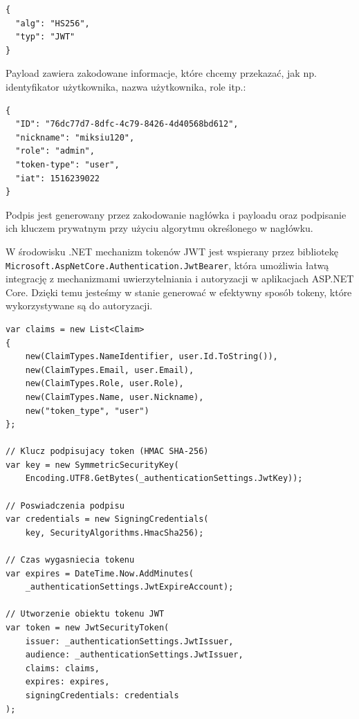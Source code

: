 \smallskip
\begin{lstlisting}
{
  "alg": "HS256",
  "typ": "JWT"
}
\end{lstlisting}

Payload zawiera zakodowane informacje, które chcemy przekazać, jak np. identyfikator użytkownika, nazwa użytkownika, role itp.:

\smallskip
\begin{lstlisting}
{
  "ID": "76dc77d7-8dfc-4c79-8426-4d40568bd612",
  "nickname": "miksiu120",
  "role": "admin",
  "token-type": "user",
  "iat": 1516239022
}
\end{lstlisting}

Podpis jest generowany przez zakodowanie nagłówka i payloadu oraz podpisanie ich kluczem prywatnym przy użyciu algorytmu określonego w nagłówku.

W środowisku .NET mechanizm tokenów JWT jest wspierany przez bibliotekę \linebreak \texttt{Microsoft.AspNetCore.Authentication.JwtBearer}, która umożliwia łatwą integrację z mechanizmami uwierzytelniania i autoryzacji w aplikacjach ASP.NET Core. Dzięki temu jesteśmy w stanie generować w efektywny sposób tokeny, które wykorzystywane są do autoryzacji.

\pagebreak

\begin{lstlisting}[language={[Sharp]C}, caption={Generowanie tokenu JWT w warstwie backendu}, label={lst:jwt-generation}]
var claims = new List<Claim>
{
    new(ClaimTypes.NameIdentifier, user.Id.ToString()),
    new(ClaimTypes.Email, user.Email),
    new(ClaimTypes.Role, user.Role),
    new(ClaimTypes.Name, user.Nickname),
    new("token_type", "user")
};

// Klucz podpisujacy token (HMAC SHA-256)
var key = new SymmetricSecurityKey(
    Encoding.UTF8.GetBytes(_authenticationSettings.JwtKey));

// Poswiadczenia podpisu
var credentials = new SigningCredentials(
    key, SecurityAlgorithms.HmacSha256);

// Czas wygasniecia tokenu
var expires = DateTime.Now.AddMinutes(
    _authenticationSettings.JwtExpireAccount);

// Utworzenie obiektu tokenu JWT
var token = new JwtSecurityToken(
    issuer: _authenticationSettings.JwtIssuer,
    audience: _authenticationSettings.JwtIssuer,
    claims: claims,
    expires: expires,
    signingCredentials: credentials
);
\end{lstlisting}

